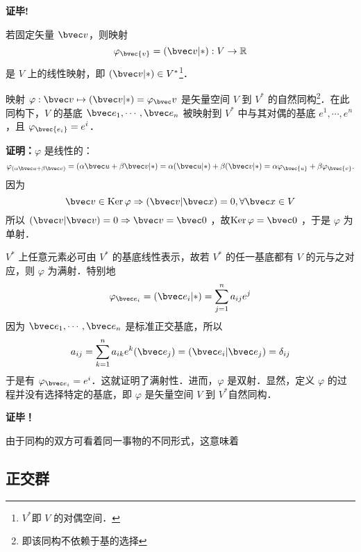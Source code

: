 \textbf{证毕!}

若固定矢量 $\bvec v$，则映射
\begin{equation}
\varphi_\bvec{v}=(\bvec v|*):V\rightarrow\mathbb{R}
\end{equation}
是 $V$ 上的线性映射，即 $(\bvec v|*)\in V^*$\footnote{$V^*$即 $V$ 的对偶空间．}．
\begin{theorem}{}
映射 $\varphi:\bvec v\mapsto (\bvec v|*)=\varphi_\bvec v$ 是矢量空间 $V$ 到 $V^*$ 的自然同构\footnote{即该同构不依赖于基的选择}．在此同构下，$V$ 的基底 $\bvec e_1,\cdots,\bvec e_n$ 被映射到 $V^*$ 中与其对偶的基底 $e^1,\cdots,e^n$，且 $\varphi_\bvec{e_i}=e^i$．
\end{theorem}
\textbf{证明：}$\varphi$ 是线性的：
\begin{equation}
\varphi_{(\alpha\bvec u+\beta\bvec v)}=(\alpha\bvec u+\beta\bvec v|*)=\alpha(\bvec u|*)+\beta(\bvec v|*)=\alpha\varphi_\bvec{u}+\beta\varphi_\bvec{v}.
\end{equation}
因为 
\begin{equation}
\bvec v\in \mathrm{Ker}\,\varphi\Rightarrow(\bvec v|\bvec x)=0,\forall\bvec x\in V
\end{equation}
所以 $(\bvec v|\bvec v)=0\Rightarrow\bvec v=\bvec 0$ ，故$\mathrm{Ker}\,\varphi=\bvec 0$ ，于是 $\varphi$ 为单射．

$V^*$ 上任意元素必可由 $V^*$ 的基底线性表示，故若 $V^*$ 的任一基底都有 $V$ 的元与之对应，则 $\varphi$ 为满射．特别地
\begin{equation}
\varphi_{\bvec e_i}=(\bvec e_i|*)=\sum_{j=1}^{n} a_{ij}e^j
\end{equation}
因为  $\bvec e_1,\cdots,\bvec e_n$ 是标准正交基底，所以
\begin{equation}
a_{ij}=\sum_{k=1}^n a_{ik}e^k(\bvec e_j)=(\bvec e_i|\bvec e_j)=\delta_{ij}
\end{equation}
于是有 $\varphi_{\bvec e_i}=e^i$．这就证明了满射性．进而，$\varphi$ 是双射．显然，定义 $\varphi$ 的过程并没有选择特定的基底，即 $\varphi$ 是矢量空间 $V$ 到 $V^*$自然同构．

\textbf{证毕！}

由于同构的双方可看着同一事物的不同形式，这意味着
\subsection{正交群}

